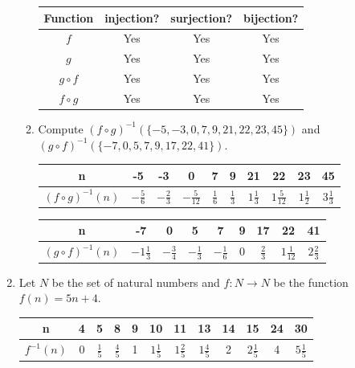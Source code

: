 \documentclass{article}
\begin{document}
\begin{enumerate}
\begin{enumerate}
        \begin{center}
        \begin{tabular}{ |c|c|c|c| }
            \hline
            Function & injection? & surjection? & bijection?\\
            \hline
            $f$ & Yes & Yes & Yes\\
            \hline
            $g$ & Yes & Yes & Yes\\
            \hline
            $g\circ f$ & Yes &Yes  & Yes\\
            \hline
            $f\circ g$ & Yes & Yes & Yes\\
            \hline
        \end{tabular}
        \end{center}

        \item Compute $(f\circ g)^{-1}(\{-5, -3, 0, 7, 9, 21, 22, 23, 45\})$ 
        and $(g\circ f)^{-1}(\{-7, 0, 5, 7, 9, 17, 22, 41\})$.

        \begin{center}
        \begin{tabular}{ c|c|c|c|c|c|c|c|c|c}
            n &-5 & -3 & 0 & 7 & 9 & 21 & 22 & 23 & 45\\
            \hline
            $(f\circ g)^{-1}(n)$ & $-\frac{5}{6}$ & $-\frac{2}{3}$ & $-\frac{5}{12}$ & $\frac{1}{6}$ & $\frac{1}{3}$ & $1\frac{1}{3}$ & $1\frac{5}{12}$ & $1\frac{1}{2}$ & $3\frac{1}{3}$\\
        \end{tabular}
        \end{center}

        \begin{center}
        \begin{tabular}{ c|c|c|c|c|c|c|c|c}
            n & -7 & 0 & 5 & 7 & 9 & 17 & 22 & 41\\
            \hline
            $(g\circ f)^{-1}(n)$ & $-1\frac{1}{3}$ & $-\frac{3}{4}$ & $-\frac{1}{3}$ & $-\frac{1}{6}$ & 0 & $\frac{2}{3}$ & $1\frac{1}{12}$ & $2\frac{2}{3}$\\
        \end{tabular}
        \end{center}

    \end{enumerate}

    \vspace{4cm}
    \item Let $N$ be the set of natural numbers and $f:N \rightarrow N$ 
    be the function $f(n) = 5n+4$. 

    \begin{center}
    \begin{tabular}{ c|c|c|c|c|c|c|c|c|c|c|c}
        n & 4 & 5 & 8 & 9 & 10 & 11 & 13 & 14 & 15 & 24 & 30\\
        \hline
        $f^{-1}(n)$ & 0 & $\frac{1}{5}$ & $\frac{4}{5}$ & 1 & $1\frac{1}{5}$ & $1\frac{2}{5}$ & $1\frac{4}{5}$ & 2 & $2\frac{1}{5}$ & 4 & $5\frac{1}{5}$
    \end{tabular}
    \end{center}
\end{enumerate}
\end{document}
